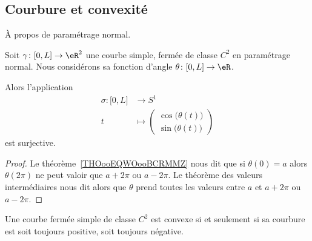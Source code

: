 \subsection{Courbure et convexité}
\label{SUBSECooNJOLooYuGRjA}

À propos de paramétrage normal.

\begin{lemma}       \label{LEMooHMFSooFlhanD}
	Soit \(   \gamma\colon \mathopen[ 0 , L \mathclose]\to \eR^2    \) une courbe simple, fermée de classe \( C^2\) en paramétrage normal. Nous considérons sa fonction d'angle \(\theta \colon \mathopen[ 0,L\mathclose]\to \eR  \).

	Alors l'application
	\begin{equation}
		\begin{aligned}
			\sigma\colon \mathopen[ 0,L\mathclose] & \to S^1                           \\
			t                                      & \mapsto \begin{pmatrix}
				                                                 \cos\big( \theta(t) \big) \\
				                                                 \sin\big( \theta(t) \big)
			                                                 \end{pmatrix}
		\end{aligned}
	\end{equation}
	est surjective.
\end{lemma}

\begin{proof}
	Le théorème~\ref{THOooEQWOooBCRMMZ} nous dit que si \( \theta(0)=a\) alors \( \theta(2\pi)\) ne peut valoir que \(a+2\pi\) ou \( a-2\pi\). Le théorème des valeurs intermédiaires nous dit alors que \( \theta\) prend toutes les valeurs entre \( a\) et \( a+2\pi\) ou \( a-2\pi\).
\end{proof}

\begin{proposition}      \label{PROPooWXUKooPOtPdj}
	Une courbe fermée simple de classe \(  C^{2}\) est convexe si et seulement si sa courbure est soit toujours positive, soit toujours négative.
\end{proposition}

